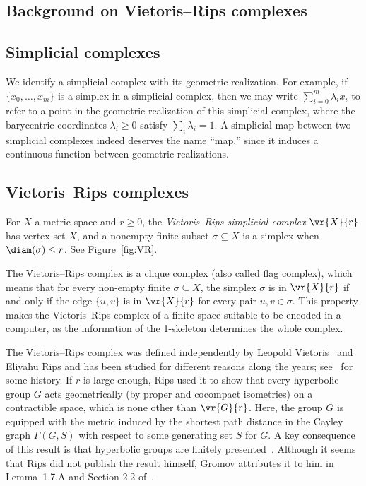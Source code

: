 \documentclass[11pt, reqno, english]{amsart}
\begin{document}
\subsection{Background on Vietoris--Rips complexes}
\label{ssec:background-vr}


\subsection*{Simplicial complexes}

We identify a simplicial complex with its geometric realization.
For example, if $\{x_0,\ldots,x_m\}$ is a simplex in a simplicial complex, then we may write $\sum_{i=0}^m\lambda_i x_i$ to refer to a point in the geometric realization of this simplicial complex, where the barycentric coordinates $\lambda_i\ge 0$ satisfy $\sum_i \lambda_i=1$.
A simplicial map between two simplicial complexes indeed deserves the name ``map,'' since it induces a continuous function between geometric realizations.


\subsection*{Vietoris--Rips complexes}

For $X$ a metric space and $r \ge 0$, the \emph{Vietoris--Rips simplicial complex $\vr{X}{r}$} has vertex set $X$, and a nonempty finite subset $\sigma\subseteq X$ is a simplex when $\diam(\sigma)\le r$.
See Figure~\ref{fig:VR}.

The Vietoris--Rips complex is a clique complex (also called flag complex), which means that for every non-empty finite $\sigma \subseteq X$, the simplex $\sigma$ is in $\vr{X}{r}$ if and only if the edge $\{u,v\}$ is in $\vr{X}{r}$ for every pair $u,v \in \sigma$.
This property makes the Vietoris--Rips complex of a finite space suitable to be encoded in a computer, as the information of the 1-skeleton determines the whole complex.

The Vietoris--Rips complex was defined independently by Leopold Vietoris~\cite{Vietoris27} and Eliyahu Rips and has been studied for different reasons along the years; see~\cite{vietoris-obituary,Hausmann1995} for some history.
If $r$ is large enough, Rips used it to show that every hyperbolic group $G$ acts geometrically (by proper and cocompact isometries) on a contractible space, which is none other than $\vr{G}{r}$.
Here, the group $G$ is equipped with the metric induced by the shortest path distance in the Cayley graph $\Gamma(G,S)$ with respect to some generating set $S$ for $G$.
A key consequence of this result is that hyperbolic groups are finitely presented~\cite[Proposition 17, Chapter 4]{GH1990}.
Although it seems that Rips did not publish the result himself, Gromov attributes it to him in Lemma~1.7.A and Section 2.2 of~\cite{Gromov1987}.
\end{document}
